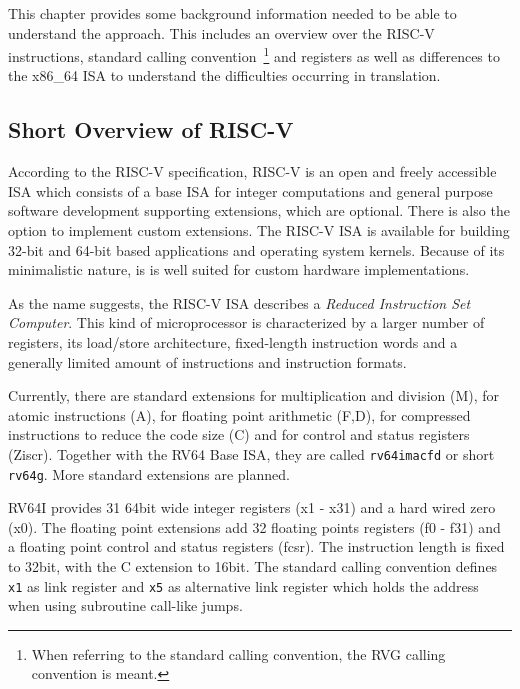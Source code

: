 \documentclass[course=eragp]{aspdoc}
\begin{document}
This chapter provides some background information needed to be able to understand the approach. This
includes an overview over the RISC-V instructions, standard calling convention~\footnote{When
    referring to the standard calling convention, the RVG calling convention is meant.} and registers
as well as differences to the x86\_64 ISA to understand the difficulties occurring in translation.

\subsection{Short Overview of RISC-V}

According to the RISC-V specification, RISC-V is an open and freely accessible ISA
which consists of a base ISA for integer computations and general purpose software development
supporting extensions, which are optional. There is also the
option to implement custom extensions. The RISC-V ISA is available for building 32-bit and 64-bit based
applications and operating system kernels. Because of its minimalistic nature, is is well suited for
custom hardware implementations.~\cite{rvspec}

\par

As the name suggests, the
RISC-V ISA describes a \emph{Reduced Instruction Set Computer}. This kind of microprocessor is
characterized by a larger number of
registers, its load/store architecture, fixed-length instruction words and a generally limited
amount of instructions and instruction formats.~\cite{RISCvCISC}

\par

Currently, there are standard extensions for multiplication and division (M), for atomic
instructions (A), for floating point arithmetic (F,D), for compressed instructions to reduce the
code size (C) and for control and status registers (Ziscr). Together with the RV64 Base
ISA, they are called \texttt{rv64imacfd} or short \texttt{rv64g}. More standard extensions are planned.~\cite{rvspec}

\par

RV64I provides 31 64bit wide integer registers (x1 - x31) and a hard wired zero (x0). The floating
point extensions add 32 floating points registers (f0 - f31) and a floating point control and status
registers (fcsr). The instruction length is fixed to 32bit, with the C extension to 16bit. The
standard calling convention defines \texttt{x1} as link register and \texttt{x5} as alternative link
register which holds the address when using subroutine call-like jumps.~\cite{rvspec}
\end{document}
